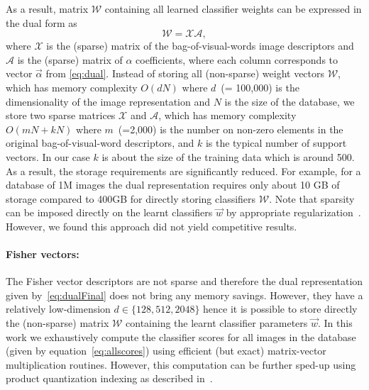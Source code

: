    
    As a result, matrix $\mathcal{W}$ containing all learned classifier weights can be expressed in the dual form as
      \begin{equation}
        \label{eq:dualFinal}
        \mathcal{W} = \mathcal{X} \mathcal{A},  
      \end{equation}
    \noindent
    where $\mathcal{X}$ is the (sparse) matrix of the bag-of-visual-words image descriptors and $\mathcal{A}$ is the (sparse) matrix of $\alpha$ coefficients, 
    where each column corresponds to vector $\vec{\alpha}$ from \eqref{eq:dual}. 
    Instead of storing all (non-sparse) weight vectors $\mathcal{W}$, which has memory complexity $O(dN)$ where $d$~(= 100,000) is the dimensionality of the image representation and $N$ is the size of the database, we store two sparse matrices $\mathcal{X}$ and $\mathcal{A}$, which has memory complexity $O(mN+kN)$ where $m$~(=2,000) is the number on non-zero elements in the original bag-of-visual-word descriptors, and $k$ is the typical number of support vectors. In our case $k$ is about the size of the training data which is around 500. As a result, the storage requirements are significantly reduced. For example, for a database of 1M images the dual representation requires only about 10 GB of storage compared to 400GB for directly storing classifiers $\mathcal{W}$.  
    Note that sparsity can be imposed directly on the learnt classifiers $\vec{w}$ by appropriate regularization~\cite{scholkopf2002learning}. However, we found this approach did not yield competitive results.


  \paragraph{Fisher vectors:}    
    The Fisher vector descriptors are not sparse and therefore the dual representation given by~\eqref{eq:dualFinal} does not bring any memory savings.
    However, they have a relatively low-dimension $d\in\{128, 512, 2048\}$ hence it is possible to store directly the (non-sparse) matrix $\mathcal{W}$ containing the learnt classifier parameters $\vec{w}$. In this work we exhaustively compute the classifier scores for all images in the database (given by equation~\eqref{eq:allscores}) using efficient (but exact) matrix-vector multiplication routines. However, this computation can be further sped-up using product quantization indexing as described in~\cite{Jegou12}.     



